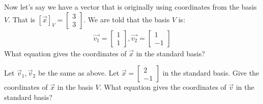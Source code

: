 \begin{enumerate}
  \qitem Now let's say we have a vector that is originally using coordinates from the basis $V$. 
  That is $[\vec{x}]_V = \begin{bmatrix} 3 \\ 3 \end{bmatrix}.$ We are told that the basis $V$ is:
  \begin{gather*}
    \vec{v_1} =
    \begin{bmatrix}
      1 \\
      1
    \end{bmatrix},
    \vec{v_2} = \begin{bmatrix}
      1 \\
      -1
    \end{bmatrix}
  \end{gather*}
  What equation gives the coordinates of $\vec{x}$ in the standard basis?


  \qitem Let $\vec{v}_1, \vec{v}_2$ be the same as above.
  Let $\vec{x} = \begin{bmatrix} 2 \\ -1 \end{bmatrix}$ in the standard basis.
  Give the coordinates of $\vec{x}$ in the basis $V$.
  What equation gives the coordinates of $\vec{v}$ in the standard basis?


\end{enumerate}
